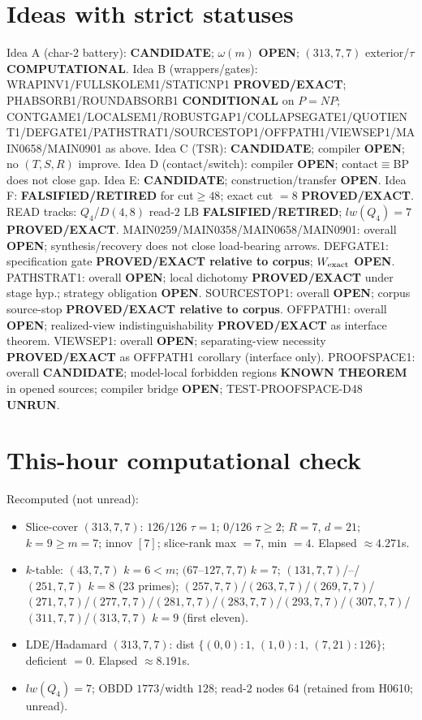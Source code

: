 \documentclass[11pt]{article}
\begin{document}
\section*{Ideas with strict statuses}
Idea A (char-2 battery): \textbf{CANDIDATE}; $\omega(m)$ \textbf{OPEN}; $(313,7,7)$ exterior/$\tau$ \textbf{COMPUTATIONAL}.
Idea B (wrappers/gates): WRAPINV1/FULLSKOLEM1/STATICNP1 \textbf{PROVED/EXACT};
PHABSORB1/ROUNDABSORB1 \textbf{CONDITIONAL} on $P=NP$;
CONTGAME1/LOCALSEM1/ROBUSTGAP1/COLLAPSEGATE1/QUOTIENT1/DEFGATE1/PATHSTRAT1/SOURCESTOP1/OFFPATH1/VIEWSEP1/MAIN0658/MAIN0901 as above.
Idea C (TSR): \textbf{CANDIDATE}; compiler \textbf{OPEN}; no $(T,S,R)$ improve.
Idea D (contact/switch): compiler \textbf{OPEN}; contact$\equiv$BP does not close gap.
Idea E: \textbf{CANDIDATE}; construction/transfer \textbf{OPEN}.
Idea F: \textbf{FALSIFIED/RETIRED} for cut$\ge48$; exact cut $=8$ \textbf{PROVED/EXACT}.
READ tracks: $Q_4$/$D(4,8)$ read-$2$ LB \textbf{FALSIFIED/RETIRED}; $lw(Q_4)=7$ \textbf{PROVED/EXACT}.
MAIN0259/MAIN0358/MAIN0658/MAIN0901: overall \textbf{OPEN}; synthesis/recovery does not close load-bearing arrows.
DEFGATE1: specification gate \textbf{PROVED/EXACT relative to corpus}; $W_{\rm exact}$ \textbf{OPEN}.
PATHSTRAT1: overall \textbf{OPEN}; local dichotomy \textbf{PROVED/EXACT} under stage hyp.; strategy obligation \textbf{OPEN}.
SOURCESTOP1: overall \textbf{OPEN}; corpus source-stop \textbf{PROVED/EXACT relative to corpus}.
OFFPATH1: overall \textbf{OPEN}; realized-view indistinguishability \textbf{PROVED/EXACT} as interface theorem.
VIEWSEP1: overall \textbf{OPEN}; separating-view necessity \textbf{PROVED/EXACT} as OFFPATH1 corollary (interface only).
PROOFSPACE1: overall \textbf{CANDIDATE}; model-local forbidden regions \textbf{KNOWN THEOREM} in opened sources;
compiler bridge \textbf{OPEN}; TEST-PROOFSPACE-D48 \textbf{UNRUN}.

\section*{This-hour computational check}
Recomputed (not unread):
\begin{itemize}
\item Slice-cover $(313,7,7)$: $126/126$ $\tau{=}1$; $0/126$ $\tau{\ge}2$; $R{=}7$, $d{=}21$;
  $k{=}9{\ge}m{=}7$; innov $[7]$; slice-rank max $=7$, min $=4$. Elapsed $\approx4.271$s.
\item $k$-table: $(43,7,7)$ $k{=}6{<}m$; $(67$--$127,7,7)$ $k{=}7$;
  $(131,7,7)$/--/$(251,7,7)$ $k{=}8$ (23 primes); $(257,7,7)$/$(263,7,7)$/$(269,7,7)$/$(271,7,7)$/$(277,7,7)$/$(281,7,7)$/$(283,7,7)$/$(293,7,7)$/$(307,7,7)$/$(311,7,7)$/$(313,7,7)$ $k{=}9$ (first eleven).
\item LDE/Hadamard $(313,7,7)$: dist $\{(0,0){:}1,\,(1,0){:}1,\,(7,21){:}126\}$; deficient $=0$. Elapsed $\approx8.191$s.
\item $lw(Q_4)=7$; OBDD $1773$/width $128$; read-$2$ nodes $64$ (retained from H0610; unread).
\end{itemize}
\end{document}
